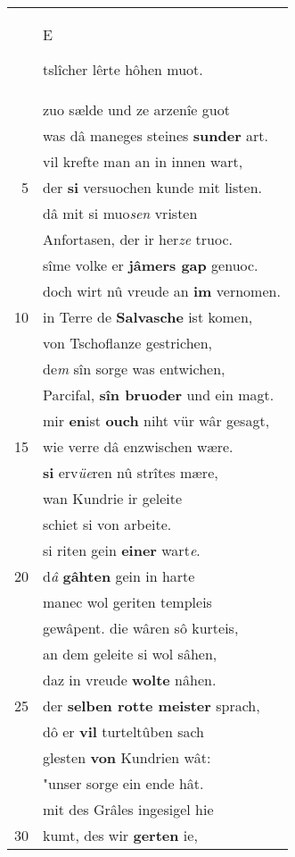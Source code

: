 \documentclass[8pt,a4paper,notitlepage]{article}
\begin{document}
\begin{table}[ht]
\begin{minipage}[t]{0.5\linewidth}
\begin{tabular}{rl}
 & \begin{large}E\end{large}tslîcher lêrte hôhen muot.\\ 
 & zuo sælde und ze arzenîe guot\\ 
 & was dâ maneges steines \textbf{sunder} art.\\ 
 & vil krefte man an in innen wart,\\ 
5 & der \textbf{si} versuochen kunde mit listen.\\ 
 & dâ mit si muo\textit{sen} vristen\\ 
 & Anfortasen, der ir her\textit{ze} truoc.\\ 
 & sîme volke er \textbf{jâmers gap} genuoc.\\ 
 & doch wirt nû vreude an \textbf{im} vernomen.\\ 
10 & in Terre de \textbf{Salvasche} ist komen,\\ 
 & von Tschoflanze gestrichen,\\ 
 & de\textit{m} sîn sorge was entwichen,\\ 
 & Parcifal, \textbf{sîn bruoder} und ein magt.\\ 
 & mir \textbf{en}ist \textbf{ouch} niht vür wâr gesagt,\\ 
15 & wie verre dâ enzwischen wære.\\ 
 & \textbf{si} erv\textit{üe}ren nû strîtes mære,\\ 
 & wan Kundrie ir geleite\\ 
 & schiet si von arbeite.\\ 
 & si riten gein \textbf{einer} wart\textit{e}.\\ 
20 & d\textit{â} \textbf{gâhten} gein in harte\\ 
 & manec wol geriten templeis\\ 
 & gewâpent. die wâren sô kurteis,\\ 
 & an dem geleite si wol sâhen,\\ 
 & daz in vreude \textbf{wolte} nâhen.\\ 
25 & der \textbf{selben rotte meister} sprach,\\ 
 & dô er \textbf{vil} turteltûben sach\\ 
 & glesten \textbf{von} Kundrien wât:\\ 
 & "unser sorge ein ende hât.\\ 
 & mit des Grâles ingesigel hie\\ 
30 & kumt, des wir \textbf{gerten} ie,\\ 
\end{tabular}

\end{minipage}
\end{table}
\end{document}
